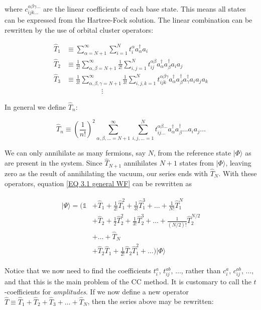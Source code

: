 \documentclass[10pt]{report}
\begin{document}
	where $c_{ijk\ldots}^{\alpha\beta\gamma\ldots}$ are the linear coefficients of each base state. This means all states can be expressed from the Hartree-Fock solution. The linear combination can be rewritten by the use of orbital cluster operators:
	
	\begin{align}
		\hat{T}_1 &\equiv \sum_{\alpha=N+1}^\infty\sum_{i=1}^Nt_i^\alpha a_ \alpha^\dagger a_i\\
		\hat{T}_2 &\equiv \frac{1}{2!}\sum_{\alpha,\beta=N+1}^\infty\frac{1}{2!}\sum_{i,j=1}^Nt_{ij}^{\alpha\beta} a_\alpha^\dagger a_\beta^\dagger a_ ia_j\\
		\hat{T}_3 &\equiv \frac{1}{3!}\sum_{\alpha,\beta,\gamma=N+1}^\infty\frac{1}{3!}\sum_{i,j,k=1}^Nt_{ijk}^{\alpha\beta\gamma} a_\alpha^\dagger a_\beta^\dagger a_\gamma^\dagger a_ia_ja_k\\
		&\quad\quad\quad\quad\quad\vdots
	\end{align}
	
	In general we define $\hat{T}_n$:
	
	\begin{equation}
		\hat{T}_n \equiv \left(\frac{1}{n!}\right)^2\sum_{\alpha,\beta,\ldots=N+1}^\infty\sum_{i,j,\ldots=1}^N t_{ij\ldots}^{\alpha\beta\ldots} a_\alpha^\dagger a_\beta^\dagger \ldots a_ ia_j\ldots
	\end{equation}
	
	We can only annihilate as many fermions, say $N$, from the reference state $|\Phi\rangle$ as are present in the system. Since $\hat{T}_{N+1}$ annihilates $N+1$ states from $|\Phi\rangle$, leaving zero as the result of annihilating the vacuum, our series ends with $\hat{T}_N$. With these operators, equation \ref{EQ 3.1 general WF} can be rewritten as
	
	\begin{align}
		\begin{split}
		|\Psi\rangle = \Big(\mathds{1} &+ \hat{T}_1 + \frac{1}{2!}\hat{T}_1^2 + \frac{1}{3!}\hat{T}_1^3 + \ldots + \frac{1}{N!}\hat{T}_1^N\\
		&+ \hat{T}_2 + \frac{1}{2}\hat{T}_2^2 + \frac{1}{3!}\hat{T}_2^3 + \ldots + \frac{1}{(N/2)!}\hat{T}_2^{N/2}\\
		&+ \ldots + \hat{T}_N \\
		&+ \hat{T}_2\hat{T}_1 + \frac{1}{2!}\hat{T}_2\hat{T}_1^2 + \ldots\Big)|\Phi\rangle
		\end{split}
	\end{align}
	
	Notice that we now need to find the coefficients $t_i^a$, $t_{ij}^{ab}$, $\ldots$, rather than $c_i^a$, $c_{ij}^{ab}$, $\ldots$, and that this is the main problem of the CC method. It is customary to call the $t$-coefficients for \emph{amplitudes}. If we now define a new operator $\hat{T} \equiv \hat{T}_1 + \hat{T}_2 + \hat{T}_3 + \ldots + \hat{T}_N$, then the series above may be rewritten:
	
\end{document}
